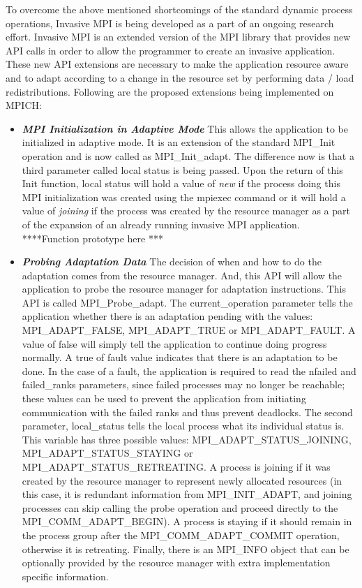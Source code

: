 To overcome the above mentioned shortcomings of the standard dynamic process operations, Invasive MPI is being developed as a part of an ongoing research effort. Invasive MPI is an extended version of the MPI library that provides new API calls in order to allow the programmer to create an invasive application. These new API extensions are necessary to make the application resource aware and to adapt according to a change in the resource set by performing data / load redistributions. Following are the proposed extensions being implemented on MPICH:

\begin{itemize}
\item \textbf{\textit{MPI Initialization in Adaptive Mode}} This allows the application to be initialized in adaptive mode. It is an extension of the standard MPI{\_}Init operation and is now called as MPI{\_}Init{\_}adapt. The difference now is that a third parameter called local status is being passed. Upon the return of this Init function, local status will hold a value of \textit{new} if the process doing this MPI initialization was created using the mpiexec command or it will hold a value of \textit{joining} if the process was created by the resource manager as a part of the expansion of an already running invasive MPI application.
****Function prototype here ***
\item \textbf{\textit{Probing Adaptation Data}} The decision of when and how to do the adaptation comes from the resource manager. And, this API will allow the application to probe the resource manager for adaptation instructions. This API is called MPI{\_}Probe{\_}adapt. The current{\_}operation parameter tells the application whether there is an adaptation pending with the values: MPI{\_}ADAPT{\_}FALSE, MPI{\_}ADAPT{\_}TRUE or MPI{\_}ADAPT{\_}FAULT. A value of false will simply tell the application to continue doing progress normally. A true of fault value indicates that there is an adaptation to be done. In the case of a fault, the application is required to read the nfailed and failed{\_}ranks parameters, since failed processes may no longer be reachable; these values can be used to prevent the application from initiating communication with the failed  ranks and thus prevent deadlocks. The second parameter, local{\_}status tells the local process what its individual status is. This variable has three possible values: MPI{\_}ADAPT{\_}STATUS{\_}JOINING, MPI{\_}ADAPT{\_}STATUS{\_}STAYING or MPI{\_}ADAPT{\_}STATUS{\_}RETREATING. A process is joining if it was created by the resource manager to represent newly allocated resources (in this case, it is redundant information from MPI{\_}INIT{\_}ADAPT, and joining processes can skip calling the probe operation and proceed directly to the MPI{\_}COMM{\_}ADAPT{\_}BEGIN). A process is staying if it should remain in the process group after the MPI{\_}COMM{\_}ADAPT{\_}COMMIT operation, otherwise it is retreating. Finally, there is an MPI{\_}INFO object that can be optionally provided by the resource manager with extra implementation specific information.

\end{itemize}
